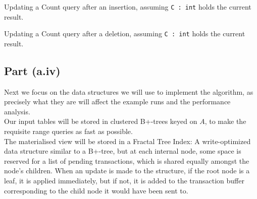\begin{algorithm}

  \caption{Updating a Count query after an insertion, assuming \texttt{C\,:\,int} holds the current result.}\label{alg:up-count-insert}
\end{algorithm}
\begin{algorithm}
  \caption{Updating a Count query after a deletion, assuming \texttt{C\,:\,int} holds the current result.}\label{alg:up-count-delete}
\end{algorithm}

\subsection{Part (a.iv)}\label{sec:q-1-a-iv}

Next we focus on the data structures we will use to implement the algorithm, as precisely what they are will affect the example runs and the performance analysis.\\[1em]

Our input tables will be stored in clustered B+-trees keyed on $A$, to make the requisite range queries as fast as possible.\\[1em]

The materialised view will be stored in a Fractal Tree Index: A write-optimized data structure similar to a B+-tree, but at each internal node, some space is reserved for a list of pending transactions, which is shared equally amongst the node's children. When an update is made to the structure, if the root node is a leaf, it is applied immediately, but if not, it is added to the transaction buffer corresponding to the child node it would have been sent to.\\[1em]

